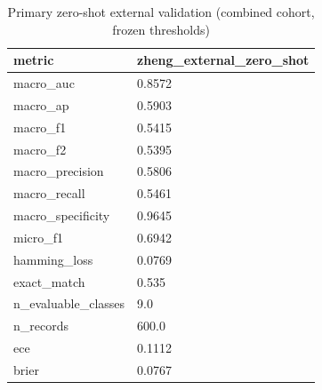 \begin{table}[htbp]\centering\small
\caption{Primary zero-shot external validation (combined cohort, frozen thresholds)}\label{tab:extclean}
\begin{tabular}{ll}
\hline
metric & zheng_external_zero_shot \\
\hline
macro_auc & 0.8572 \\
macro_ap & 0.5903 \\
macro_f1 & 0.5415 \\
macro_f2 & 0.5395 \\
macro_precision & 0.5806 \\
macro_recall & 0.5461 \\
macro_specificity & 0.9645 \\
micro_f1 & 0.6942 \\
hamming_loss & 0.0769 \\
exact_match & 0.535 \\
n_evaluable_classes & 9.0 \\
n_records & 600.0 \\
ece & 0.1112 \\
brier & 0.0767 \\
\hline
\end{tabular}
\end{table}
